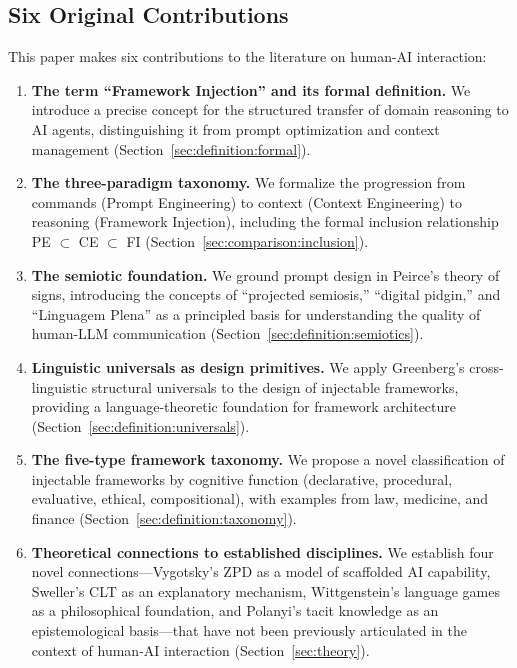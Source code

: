 \documentclass[12pt,a4paper]{article}
\begin{document}
\subsection{Six Original Contributions}
\label{sec:contributions:list}

This paper makes six contributions to the literature on human-AI interaction:

\begin{enumerate}
    \item \textbf{The term ``Framework Injection'' and its formal definition.} We introduce a precise concept for the structured transfer of domain reasoning to AI agents, distinguishing it from prompt optimization and context management (Section~\ref{sec:definition:formal}).

    \item \textbf{The three-paradigm taxonomy.} We formalize the progression from commands (Prompt Engineering) to context (Context Engineering) to reasoning (Framework Injection), including the formal inclusion relationship PE $\subset$ CE $\subset$ FI (Section~\ref{sec:comparison:inclusion}).

    \item \textbf{The semiotic foundation.} We ground prompt design in Peirce's theory of signs, introducing the concepts of ``projected semiosis,'' ``digital pidgin,'' and ``Linguagem Plena'' as a principled basis for understanding the quality of human-LLM communication (Section~\ref{sec:definition:semiotics}).

    \item \textbf{Linguistic universals as design primitives.} We apply Greenberg's cross-linguistic structural universals to the design of injectable frameworks, providing a language-theoretic foundation for framework architecture (Section~\ref{sec:definition:universals}).

    \item \textbf{The five-type framework taxonomy.} We propose a novel classification of injectable frameworks by cognitive function (declarative, procedural, evaluative, ethical, compositional), with examples from law, medicine, and finance (Section~\ref{sec:definition:taxonomy}).

    \item \textbf{Theoretical connections to established disciplines.} We establish four novel connections---Vygotsky's ZPD as a model of scaffolded AI capability, Sweller's CLT as an explanatory mechanism, Wittgenstein's language games as a philosophical foundation, and Polanyi's tacit knowledge as an epistemological basis---that have not been previously articulated in the context of human-AI interaction (Section~\ref{sec:theory}).
\end{enumerate}
\end{document}

